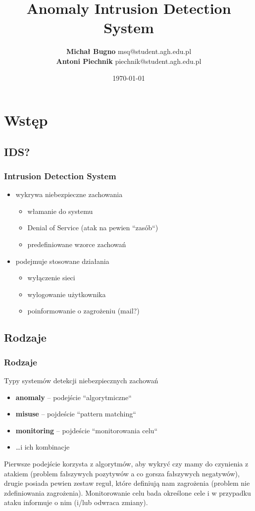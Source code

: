 \documentclass{beamer}
\title{Anomaly Intrusion Detection System}
\author[Michał Bugno \and Antoni Piechnik]
{
  \textbf{Michał Bugno} msq@student.agh.edu.pl \\
  \textbf{Antoni Piechnik} piechnik@student.agh.edu.pl
}
\date{\today}
\begin{document}
\maketitle

\section{Wstęp}

\subsection{IDS?}
\begin{frame}
  \frametitle{Intrusion Detection System}
  \begin{itemize}
    \item wykrywa niebezpieczne zachowania
    \begin{itemize}
      \item włamanie do systemu
      \item Denial of Service (atak na pewien ``zasób``)
      \item predefiniowane wzorce zachowań
    \end{itemize}
    \item podejmuje stosowane działania
    \begin{itemize}
      \item wyłączenie sieci
      \item wylogowanie użytkownika
      \item poinformowanie o zagrożeniu (mail?)
    \end{itemize}
  \end{itemize}
\end{frame}

\subsection{Rodzaje}
\begin{frame}
  \frametitle{Rodzaje}
  Typy systemów detekcji niebezpiecznych zachowań
  \begin{itemize}
    \item \textbf{anomaly} -- podejście ``algorytmiczne``
    \item \textbf{misuse} -- pojdeście ``pattern matching``
    \item \textbf{monitoring} -- pojdeście ``monitorowania celu``
    \item \ldots i ich kombinacje
  \end{itemize}
  Pierwsze podejście korzysta z algorytmów, aby wykryć czy mamy do
  czynienia z atakiem (problem fałszywych pozytywów a co gorsza fałszywych
  negatywów), drugie posiada pewien zestaw reguł, które definiują nam
  zagrożenia (problem nie zdefiniowania zagrożenia). Monitorowanie celu bada
  określone cele i w przypadku ataku informuje o nim (i/lub odwraca zmiany).
\end{frame}
\end{document}
